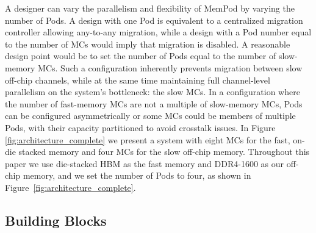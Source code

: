 A designer can vary the parallelism and flexibility of MemPod by varying the
number of Pods. A design with one Pod is equivalent to a centralized 
migration controller allowing any-to-any migration,
while a design with a Pod number equal to the number of MCs would imply that migration is disabled. A reasonable design point would be to set the number of Pods equal to the number of slow-memory MCs. Such a configuration inherently prevents migration between slow off-chip channels, while at the same time maintaining full channel-level parallelism on the system's bottleneck: the slow MCs. In a configuration where the number of fast-memory MCs are not a multiple of slow-memory MCs, Pods can be configured asymmetrically or some MCs could be members of multiple Pods, with their capacity partitioned to avoid crosstalk issues. In Figure \ref{fig:architecture_complete} we present a system with eight MCs for the fast, on-die stacked memory and four MCs for the slow off-chip memory. Throughout this paper we use die-stacked HBM as the fast memory \cite{JEDEC-HBM-REVISED} and DDR4-1600 as our off-chip memory, and 
we set the number of Pods to four, as shown in Figure~\ref{fig:architecture_complete}.

\subsection{Building Blocks}

